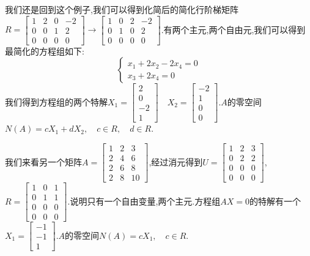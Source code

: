 \documentclass[oneside]{book}
\begin{document}
我们还是回到这个例子,我们可以得到化简后的简化行阶梯矩阵$R=\left[\begin{array}{cccc}
	1&2&0&-2\\0&0&1&2\\0&0&0&0
\end{array}\right]\rightarrow \left[\begin{array}{cccc}
1&0&2&-2\\0&1&0&2\\0&0&0&0
\end{array}\right]$.有两个主元,两个自由元,我们可以得到最简化的方程组如下:
$$\left\{\begin{array}{c}
	x_{1}+2x_{2}-2x_{4}=0\\
	x_{3}+2x_{4}=0
\end{array}\right.$$
我们得到方程组的两个特解$X_{1}=\left[\begin{array}{c}
	2\\0\\-2\\1
\end{array}\right]\quad X_{2}=\left[\begin{array}{c}
-2\\1\\0\\0
\end{array}\right]$.$A$的零空间$N(A)=cX_{1}+dX_{2} ,\quad c\in R, \quad d\in R$.

我们来看另一个矩阵$A=\left[\begin{array}{ccc}1&2&3\\2&4&6\\2&6&8\\2&8&10
\end{array}\right]$,经过消元得到$U=\left[\begin{array}{ccc}1&2&3\\0&2&2\\0&0&0\\0&0&0
\end{array}\right]$,$R=\left[\begin{array}{ccc}1&0&1\\0&1&1\\0&0&0\\0&0&0
\end{array}\right]$.说明只有一个自由变量,两个主元.方程组$AX=0$的特解有一个$X_{1}=\left[\begin{array}{c}-1\\-1\\1
\end{array}\right]$.$A$的零空间$N(A)=cX_{1} ,\quad c\in R$.
\end{document}
